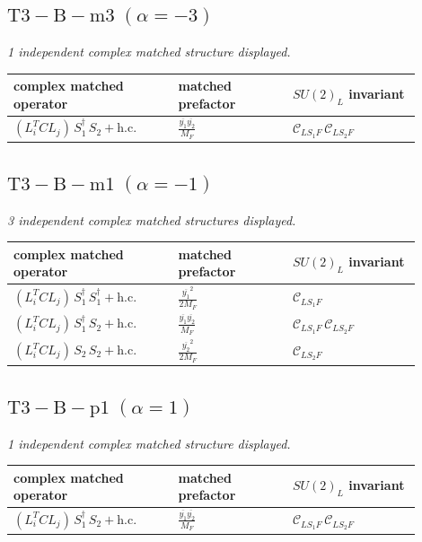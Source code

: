 \documentclass[9pt]{article}
\begin{document}
\subsection*{$ \mathrm{T3-B-m3}\;(\alpha=-3) $}
\textit{1 independent complex matched structure displayed. }
\begin{longtable}{@{}p{0.36\linewidth}p{0.25\linewidth}p{0.29\linewidth}@{}}
\toprule
complex matched operator & matched prefactor & $SU(2)_L$ invariant \\
\midrule
$ (L_i^T C L_j)\,S_1^\dagger\,S_2+\mathrm{h.c.} $ & $ \frac{\overline{y_{1}} \overline{y_{2}}}{M_F} $ & $ \mathcal{C}_{LS_1F}\,\mathcal{C}_{LS_2F} $ \\
\bottomrule
\end{longtable}
\subsection*{$ \mathrm{T3-B-m1}\;(\alpha=-1) $}
\textit{3 independent complex matched structures displayed. }
\begin{longtable}{@{}p{0.36\linewidth}p{0.25\linewidth}p{0.29\linewidth}@{}}
\toprule
complex matched operator & matched prefactor & $SU(2)_L$ invariant \\
\midrule
$ (L_i^T C L_j)\,S_1^\dagger\,S_1^\dagger+\mathrm{h.c.} $ & $ \frac{\overline{y_{1}}^{2}}{2 M_F} $ & $ \mathcal{C}_{LS_1F} $ \\
$ (L_i^T C L_j)\,S_1^\dagger\,S_2+\mathrm{h.c.} $ & $ \frac{\overline{y_{1}} \overline{y_{2}}}{M_F} $ & $ \mathcal{C}_{LS_1F}\,\mathcal{C}_{LS_2F} $ \\
$ (L_i^T C L_j)\,S_2\,S_2+\mathrm{h.c.} $ & $ \frac{\overline{y_{2}}^{2}}{2 M_F} $ & $ \mathcal{C}_{LS_2F} $ \\
\bottomrule
\end{longtable}
\subsection*{$ \mathrm{T3-B-p1}\;(\alpha=1) $}
\textit{1 independent complex matched structure displayed. }
\begin{longtable}{@{}p{0.36\linewidth}p{0.25\linewidth}p{0.29\linewidth}@{}}
\toprule
complex matched operator & matched prefactor & $SU(2)_L$ invariant \\
\midrule
$ (L_i^T C L_j)\,S_1^\dagger\,S_2+\mathrm{h.c.} $ & $ \frac{\overline{y_{1}} \overline{y_{2}}}{M_F} $ & $ \mathcal{C}_{LS_1F}\,\mathcal{C}_{LS_2F} $ \\
\bottomrule
\end{longtable}
\end{document}
